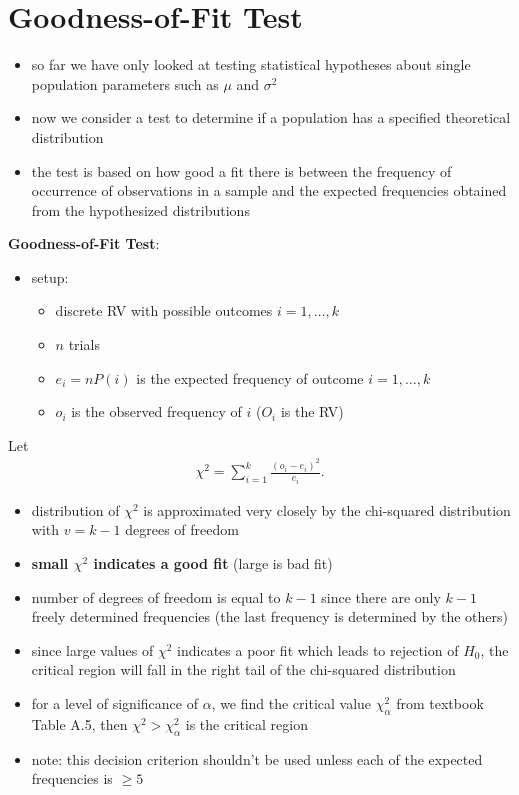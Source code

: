 \documentclass[10pt]{article}
\begin{document}
\section{Goodness-of-Fit Test}
\begin{itemize}
    \item so far we have only looked at testing statistical hypotheses about single population parameters such as $\mu$ and $\sigma^2$
    \item now we consider a test to determine if a population has a specified theoretical distribution
    \item the test is based on how good a fit there is between the frequency of occurrence of observations in a sample and the expected frequencies obtained from the hypothesized distributions
\end{itemize}
\begin{definition}
    \textbf{Goodness-of-Fit Test}:
    \begin{itemize}
        \item setup:
            \begin{itemize}
                \item discrete RV with possible outcomes $i = 1, \ldots, k$ 
                \item $n$ trials 
                \item $e_i = nP(i)$ is the expected frequency of outcome $i = 1, \ldots, k$ 
                \item $o_i$ is the observed frequency of $i$ ($O_i$ is the RV)
            \end{itemize}
    \end{itemize}
    Let
    \begin{gather*}
        \chi^2 = \sum_{i=1}^{k} \frac{(o_i - e_i)^2}{e_i}
    .\end{gather*}
    \begin{itemize}
        \item distribution of $\chi^2$ is approximated very closely by the chi-squared distribution with $v=k-1$ degrees of freedom
        \item \textbf{small $\chi^2$ indicates a good fit} (large is bad fit)
        \item number of degrees of freedom is equal to $k-1$ since there are only $k-1$ freely determined frequencies (the last frequency is determined by the others)
    \end{itemize}
\end{definition}
\begin{itemize}
    \item since large values of $\chi^2$ indicates a poor fit which leads to rejection of $H_0$, the critical region will fall in the right tail of the chi-squared distribution
    \item for a level of significance of $\alpha$, we find the critical value $\chi^2_\alpha$ from textbook Table A.5, then $\chi^2 > \chi^2_\alpha$ is the critical region
    \item note: this decision criterion shouldn't be used unless each of the expected frequencies is $\ge 5$
\end{itemize}
\end{document}
